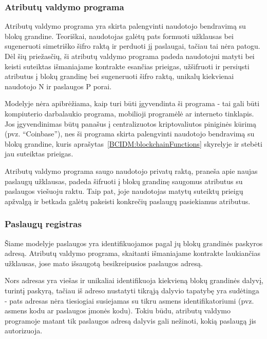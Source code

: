\subsubsection{Atributų valdymo programa}

Atributų valdymo programa yra skirta palengvinti naudotojo bendravimą su blokų grandine. Teoriškai, naudotojas galėtų pats formuoti užklausas
bei sugeneruoti simetriško šifro raktą ir perduoti jį paslaugai, tačiau tai nėra patogu. Dėl šių priežasčių, ši atributų valdymo
programa padeda naudotojui matyti bei keisti suteiktas išmaniajame kontrakte esančias prieigas, užšifruoti ir persiųsti atributus į blokų grandinę
bei sugeneruoti šifro raktą, unikalų kiekvienai naudotojo N ir paslaugos P porai.

Modelyje nėra apibrėžiama, kaip turi būti įgyvendinta ši programa - tai gali būti kompiuterio darbalaukio programa,
mobilioji programėlė ar 
interneto tinklapis. Jos įgyvendinimas būtų panašus į centralizuotos kriptovaliutos piniginės kūrimą (pvz. \enquote{Coinbase}), nes ši
programa skirta palengvinti naudotojo bendravimą su blokų grandine, kuris aprašytas\hypertarget{BCIDM:blockchainFunctions}{~\ref{BCIDM:blockchainFunctions}} skyrelyje ir
stebėti jau suteiktas prieigas.

Atributų valdymo programa saugo naudotojo privatų raktą, praneša apie naujas paslaugų užklausas, padeda šifruoti
į blokų grandinę saugomus atributus su paslaugos viešuoju raktu. Taip pat, joje naudotojas
matytų suteiktų prieigų apžvalgą ir betkada galėtų pakeisti konkrečių paslaugų pasiekiamus atributus.

\subsubsection{Paslaugų registras}

Šiame modelyje paslaugos yra identifikuojamos pagal jų blokų grandinės paskyros adresą. Atributų valdymo programa,
skaitanti išmaniajame kontrakte laukiančias užklausas, jose mato išsaugotą besikreipusios paslaugos adresą.

Nors adresas yra viešas ir unikaliai identifikuoja kiekvieną blokų grandinės dalyvį, turintį paskyrą, tačiau iš adreso nustatyti tikrąją dalyvio tapatybę yra sudėtinga -
pats adresas nėra tiesiogiai susiejamas su tikru asmens identifikatoriumi (pvz. asmens kodu ar paslaugos įmonės kodu).
Tokiu būdu, atributų valdymo programoje matant tik paslaugos adresą dalyvis gali nežinoti, kokią paslaugą jis autorizuoja.


